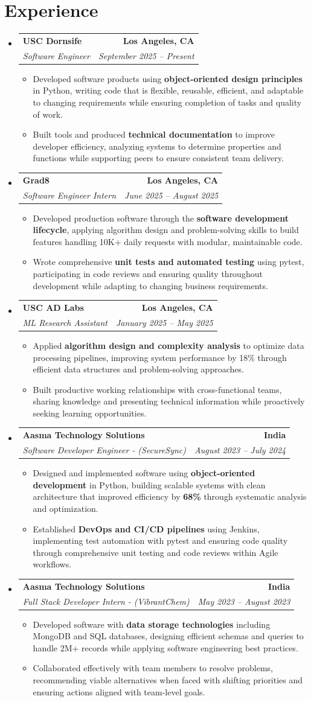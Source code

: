 \documentclass[letterpaper,10pt]{article}
\makeatletter
\newcommand{\resumeItem}[1]{\item\small{{#1 \vspace{-2pt}}}}
\newcommand{\resumeSubheading}[4]{\vspace{-1pt}\item\begin{tabular*}{1.0\textwidth}[t]{l@{\extracolsep{\fill}}r}\textbf{#1} & \textbf{\small #2} \\\textit{\small#3} & \textit{\small #4} \\\end{tabular*}\vspace{-2pt}}
\newcommand{\resumeSubHeadingListStart}{\begin{itemize}[leftmargin=0.0in, label={}]}
\newcommand{\resumeSubHeadingListEnd}{\end{itemize}}
\newcommand{\resumeItemListStart}{\begin{itemize}[leftmargin=0.15in,label=\textbullet,itemsep=2pt,topsep=0pt,parsep=0pt,partopsep=0pt]}
\newcommand{\resumeItemListEnd}{\end{itemize}\vspace{-4pt}}
\makeatother
\begin{document}
\section{Experience}
\resumeSubHeadingListStart
\resumeSubheading{USC Dornsife}{Los Angeles, CA}{Software Engineer}{September 2025 -- Present}
\resumeItemListStart
\resumeItem{Developed software products using \textbf{object-oriented design principles} in Python, writing code that is flexible, reusable, efficient, and adaptable to changing requirements while ensuring completion of tasks and quality of work.}
\resumeItem{Built tools and produced \textbf{technical documentation} to improve developer efficiency, analyzing systems to determine properties and functions while supporting peers to ensure consistent team delivery.}
\resumeItemListEnd
\resumeSubheading{Grad8}{Los Angeles, CA}{Software Engineer Intern}{June 2025 -- August 2025}
\resumeItemListStart
\resumeItem{Developed production software through the \textbf{software development lifecycle}, applying algorithm design and problem-solving skills to build features handling 10K+ daily requests with modular, maintainable code.}
\resumeItem{Wrote comprehensive \textbf{unit tests and automated testing} using pytest, participating in code reviews and ensuring quality throughout development while adapting to changing business requirements.}
\resumeItemListEnd
\resumeSubheading{USC AD Labs}{Los Angeles, CA}{ML Research Assistant}{January 2025 -- May 2025}
\resumeItemListStart
\resumeItem{Applied \textbf{algorithm design and complexity analysis} to optimize data processing pipelines, improving system performance by 18\% through efficient data structures and problem-solving approaches.}
\resumeItem{Built productive working relationships with cross-functional teams, sharing knowledge and presenting technical information while proactively seeking learning opportunities.}
\resumeItemListEnd
\resumeSubheading{Aasma Technology Solutions}{India}{Software Developer Engineer - (SecureSync)}{August 2023 -- July 2024}
\resumeItemListStart
\resumeItem{Designed and implemented software using \textbf{object-oriented development} in Python, building scalable systems with clean architecture that improved efficiency by \textbf{68\%} through systematic analysis and optimization.}
\resumeItem{Established \textbf{DevOps and CI/CD pipelines} using Jenkins, implementing test automation with pytest and ensuring code quality through comprehensive unit testing and code reviews within Agile workflows.}
\resumeItemListEnd
\resumeSubheading{Aasma Technology Solutions}{India}{Full Stack Developer Intern - (VibrantChem)}{May 2023 -- August 2023}
\resumeItemListStart
\resumeItem{Developed software with \textbf{data storage technologies} including MongoDB and SQL databases, designing efficient schemas and queries to handle 2M+ records while applying software engineering best practices.}
\resumeItem{Collaborated effectively with team members to resolve problems, recommending viable alternatives when faced with shifting priorities and ensuring actions aligned with team-level goals.}
\resumeItemListEnd
\resumeSubHeadingListEnd
\vspace{-14pt}
\end{document}
